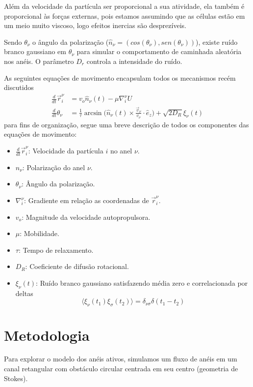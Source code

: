 \documentclass{article}
\theoremstyle{definition}
\def \quantity#1#2#3{\vec{#1}_{#2}^{#3}}
\def \pos#1#2{\quantity{r}{#1}{#2}}
\begin{document}
Além da velocidade da partícula ser proporcional a sua atividade, ela também é proporcional às forças externas, pois estamos assumindo que as células estão em um meio muito viscoso, logo efeitos inercias são desprezíveis.

Sendo $\theta_\nu$ o ângulo da polarização ($\hat n_\nu = (cos(\theta_\nu), sen(\theta_\nu))$), existe ruído branco gaussiano em $\theta_\nu$ para simular o comportamento de caminhada aleatória nos anéis. O parâmetro $D_r$ controla a intensidade do ruído.

As seguintes equações de movimento encapsulam todos os mecanismos recém discutidos
\begin{equation}
\begin{aligned}
\frac{d}{dt}\pos{i}{\nu} &= v_o \hat n_\nu(t) - \mu \nabla_i^\nu U \\
\frac{d}{dt}\theta_{\nu} &= \frac{1}{\tau}\arcsin\bigg(\hat n_\nu(t) \times \frac{\vec v_{\nu}}{v_{\nu}} \cdot \hat e_z \bigg) + \sqrt{2 D_R}\xi_\nu(t)
\end{aligned}
\label{eq:eq_motion}
\end{equation}
para fins de organização, segue uma breve descrição de todos os componentes das equações de movimento:
\begin{itemize}
    \item $\frac{d}{dt}\pos{i}{\nu}$: Velocidade da partícula $i$ no anel $\nu$.
    \item $\hat n_\nu$: Polarização do anel $\nu$.
    \item $\theta_\nu$: Ângulo da polarização.
    \item $\nabla_i^\nu$: Gradiente em relação as coordenadas de $\pos{i}{\nu}$.
    \item $v_o$: Magnitude da velocidade autopropulsora. 
    \item $\mu$: Mobilidade. 
    \item $\tau$: Tempo de relaxamento. 
    \item $D_R$: Coeficiente de difusão rotacional.
    \item $\xi_\nu(t)$: Ruído branco gaussiano satisfazendo média zero e correlacionada por deltas
    $$\langle \xi_\nu(t_1) \xi_\sigma(t_2) \rangle = \delta_{\nu \sigma}\delta(t_1 - t_2)$$
\end{itemize}

\section{Metodologia}
Para explorar o modelo dos anéis ativos, simulamos um fluxo de anéis em um canal retangular com obstáculo circular centrada em seu centro (geometria de Stokes). 
\end{document}
